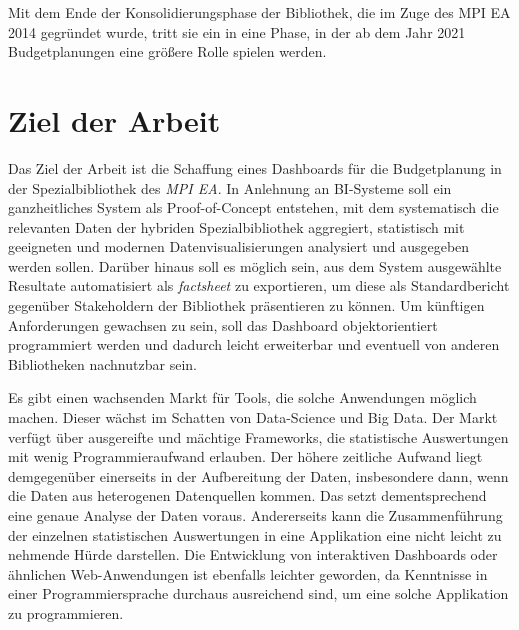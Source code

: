 
Mit dem Ende der Konsolidierungsphase der
Bibliothek, die im Zuge des \acrshort{MPI EA} 2014 gegründet wurde, tritt sie ein in eine Phase, in der ab dem Jahr
2021 Budgetplanungen eine größere Rolle spielen werden.


\section{Ziel der Arbeit}
Das Ziel der Arbeit ist die Schaffung eines Dashboards für die Budgetplanung in der Spezialbibliothek des \textit{\acrshort{MPI EA}}.
In Anlehnung an \acrfull{BI}-Systeme soll ein ganzheitliches System als Proof-of-Concept entstehen,
mit dem systematisch die relevanten Daten der hybriden Spezialbibliothek aggregiert, statistisch
mit geeigneten und modernen Datenvisualisierungen analysiert und ausgegeben werden sollen.
Darüber hinaus soll es möglich sein, aus dem System ausgewählte
Resultate automatisiert als \textit{factsheet} zu exportieren, um diese
als Standardbericht gegenüber Stakeholdern der Bibliothek präsentieren zu können.
Um künftigen Anforderungen gewachsen zu sein, soll das Dashboard
objektorientiert programmiert werden und dadurch leicht erweiterbar und eventuell von
anderen Bibliotheken nachnutzbar sein.


Es gibt einen wachsenden Markt für Tools, die solche Anwendungen möglich machen. Dieser wächst im Schatten von Data-Science und Big Data. 
Der Markt verfügt über ausgereifte und mächtige Frameworks, die statistische Auswertungen mit wenig Programmieraufwand erlauben. 
Der höhere zeitliche Aufwand liegt demgegenüber einerseits in der Aufbereitung der Daten, insbesondere dann, wenn die Daten aus heterogenen Datenquellen kommen. 
Das setzt dementsprechend eine genaue Analyse der Daten voraus. Andererseits kann die Zusammenführung der einzelnen statistischen Auswertungen in eine Applikation 
eine nicht leicht zu nehmende Hürde darstellen. Die Entwicklung von interaktiven Dashboards oder ähnlichen Web-Anwendungen ist ebenfalls leichter geworden, da
Kenntnisse in einer Programmiersprache durchaus ausreichend sind, um eine solche Applikation zu programmieren.


